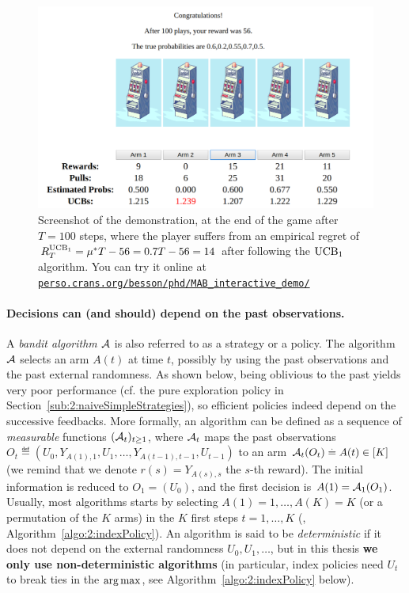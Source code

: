 \begin{figure}[h!]  %
    \centering
    \includegraphics[width=0.85\linewidth]{2-Chapters/2-Chapter/Images/example_of_a_5_arm_bandit_problem__step100.png}
    \caption[Screenshot of the demonstration, at the end of the game after $T=100$ steps.]{Screenshot of the demonstration, at the end of the game after $T=100$ steps, where the player suffers from an empirical regret of $R^{\mathrm{UCB}_1}_T = \mu^* T - 56 = 0.7 T - 56 = 14$ after following the $\mathrm{UCB}_1$ algorithm.
        You can try it online at \href{https://perso.crans.org/besson/phd/MAB\_interactive\_demo/}{\texttt{perso.crans.org/besson/phd/MAB\_interactive\_demo/}}}
    \label{fig:2:example_of_a_5_arm_bandit_problem__step100}
\end{figure}


\paragraph{Decisions can (and should) depend on the past observations.}

A \emph{bandit algorithm} $\mathcal{A}$ is also referred to as a strategy or a policy.
The algorithm $\mathcal{A}$ selects an arm $A(t)$ at time $t$, possibly by using the past observations and the past external randomness.
As shown below, being oblivious to the past yields very poor performance (cf. the pure exploration policy in Section~\ref{sub:2:naiveSimpleStrategies}), so efficient policies indeed depend on the successive feedbacks.
%
More formally, an algorithm can be defined as a sequence of \emph{measurable} functions $(\mathcal{A}_t)_{t\geq1}$,
where $\mathcal{A}_t$ maps the past observations $O_t \eqdef (U_0, Y_{A(1),1}, U_1, \dots, Y_{A(t-1),t-1}, U_{t-1})$
to an arm $\mathcal{A}_t(O_t) \overset{.}{=} A(t) \in[K]$
(we remind that we denote $r(s) = Y_{A(s),s}$ the $s$-th reward).
The initial information is reduced to $O_1 = (U_0)$, and the first decision is $A(1) = \mathcal{A}_1(O_1)$. Usually, most algorithms starts by selecting $A(1)=1,\dots,A(K)=K$ (or a permutation of the $K$ arms) in the $K$ first steps $t=1,\dots,K$ (\eg, Algorithm~\ref{algo:2:indexPolicy}).
%
An algorithm is said to be \emph{deterministic} if it does not depend on the external randomness $U_0,U_1,\dots$, but in this thesis \textbf{we only use non-deterministic algorithms}
(in particular, index policies need $U_t$ to break ties in the $\operatorname*{arg\,max}$, see Algorithm~\ref{algo:2:indexPolicy} below).


